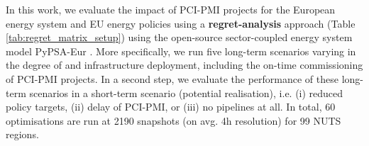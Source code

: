 \documentclass[a0,portrait]{a0poster}
\begin{document}
\begin{multicols}{3}
\noindent In this work, we evaluate the impact of PCI-PMI projects for the European energy system and EU energy policies using a \textbf{regret-analysis} approach (Table \ref{tab:regret_matrix_setup}) using the open-source sector-coupled energy system model PyPSA-Eur \cite{hofmannH2CO2Network2025,horschPyPSAEurOpenOptimisation2018,neumannPotentialRoleHydrogen2023}. More specifically, we run five long-term scenarios varying in the degree of  and  infrastructure deployment, including the on-time commissioning of PCI-PMI projects. In a second step, we evaluate the performance of these long-term scenarios in a short-term scenario (potential realisation), i.e. (i) reduced policy targets, (ii) delay of PCI-PMI, or (iii) no pipelines at all. In total, 60 optimisations are run at 2190 snapshots (on avg. 4h resolution) for 99 NUTS regions.

\vspace{2em}


\end{multicols}
\end{document}
